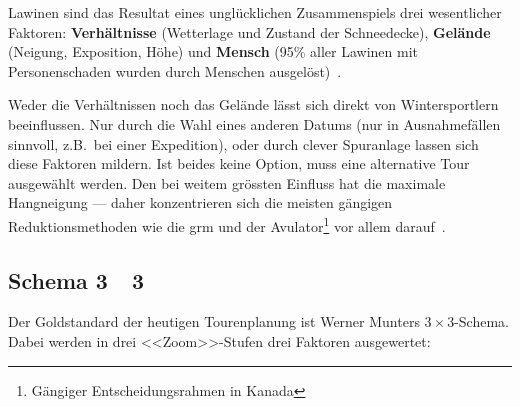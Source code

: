 Lawinen sind das Resultat eines unglücklichen Zusammenspiels drei wesentlicher Faktoren: 
\textbf{Verhältnisse} (Wetterlage und Zustand der Schneedecke), \textbf{Gelände} (Neigung, Exposition, Höhe) und \textbf{Mensch} (95\% aller Lawinen mit Personenschaden wurden durch Menschen ausgelöst)~\cite{ortovoxlabsnow}.

Weder die Verhältnissen noch das Gelände lässt sich direkt von Wintersportlern beeinflussen. Nur durch die Wahl eines anderen Datums (nur in Ausnahmefällen sinnvoll, z.B.\ bei einer Expedition), oder durch clever Spuranlage lassen sich diese Faktoren mildern. 
Ist beides keine Option, muss eine alternative Tour ausgewählt werden.
Den bei weitem grössten Einfluss hat die maximale Hangneigung --- daher konzentrieren sich die meisten gängigen Reduktionsmethoden wie die \gls{grm} und der Avulator\footnote{Gängiger Entscheidungsrahmen in Kanada} vor allem darauf~\cite{arpddatasetdocs}\cite{harveyrhynerschweizerlawinenkunde}.

\subsection{Schema 3~\texttimes~3}
Der Goldstandard der heutigen Tourenplanung ist Werner Munters $3\times3$-Schema. Dabei werden in drei <<Zoom>>-Stufen drei Faktoren ausgewertet:


